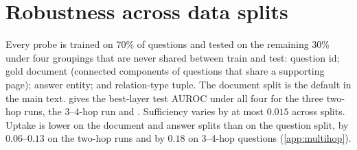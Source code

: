 \section{Robustness across data splits}
\label{app:splits}
Every probe is trained on 70\% of questions and tested on the remaining 30\% under four groupings that are never shared between train and test: question id; gold document (connected components of questions that share a supporting page); answer entity; and relation-type tuple. The document split is the default in the main text.  gives the best-layer test AUROC under all four for the three two-hop runs, the 3--4-hop run and \twowiki{}. Sufficiency varies by at most $0.015$ across splits. Uptake is lower on the document and answer splits than on the question split, by $0.06$--$0.13$ on the two-hop runs and by $0.18$ on 3--4-hop questions (\cref{app:multihop}).
\begin{table}[h]
\centering\small

\caption{Best-layer AUROC under the four disjoint splits, for the three 2-hop runs, the 3--4-hop run and \twowiki{}.}
\label{tab:splits}
\end{table}
